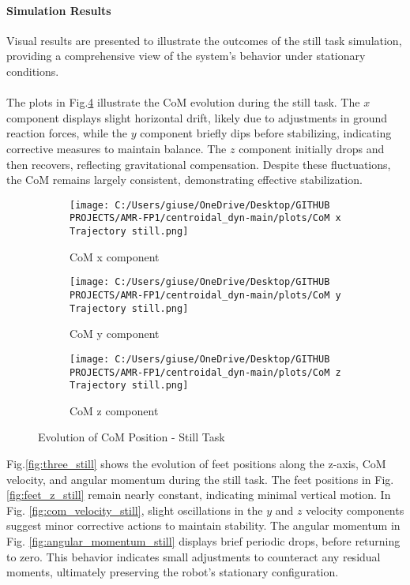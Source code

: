 \documentclass[main.tex]{subfiles}
\begin{document}
\begin{sloppypar}
\paragraph{Simulation Results}
Visual results are presented to illustrate the outcomes of the still task simulation, providing a comprehensive view of the system’s behavior under stationary conditions.\\
\\
The plots in Fig.\ref{fig:com_still} illustrate the CoM evolution during the still task. The \( x \) component displays slight horizontal drift, likely due to adjustments in ground reaction forces, while the \( y \) component briefly dips before stabilizing, indicating corrective measures to maintain balance. The \( z \) component initially drops and then recovers, reflecting gravitational compensation. Despite these fluctuations, the CoM remains largely consistent, demonstrating effective stabilization. \\
\begin{figure}[H]
    \centering
    \begin{subfigure}[b]{0.32\textwidth}
        \centering
        \texttt{[image: C:/Users/giuse/OneDrive/Desktop/GITHUB PROJECTS/AMR-FP1/centroidal\_dyn-main/plots/CoM x Trajectory still.png]}
        \caption{CoM x component}
        \label{fig:com_x_still}
    \end{subfigure}
    \hfill
    \begin{subfigure}[b]{0.32\textwidth}
        \centering
        \texttt{[image: C:/Users/giuse/OneDrive/Desktop/GITHUB PROJECTS/AMR-FP1/centroidal\_dyn-main/plots/CoM y Trajectory still.png]}
        \caption{CoM y component}
        \label{fig:com_y_still}
    \end{subfigure}
    \hfill
    \begin{subfigure}[b]{0.32\textwidth}
        \centering
        \texttt{[image: C:/Users/giuse/OneDrive/Desktop/GITHUB PROJECTS/AMR-FP1/centroidal\_dyn-main/plots/CoM z Trajectory still.png]}
        \caption{CoM z component}
        \label{fig:com_z_still}
    \end{subfigure}
    \caption{Evolution of CoM Position - Still Task}
    \label{fig:com_still}
\end{figure}
Fig.\ref{fig:three_still} shows the evolution of feet positions along the z-axis, CoM velocity, and angular momentum during the still task. The feet positions in Fig. \ref{fig:feet_z_still} remain nearly constant, indicating minimal vertical motion. In Fig. \ref{fig:com_velocity_still}, slight oscillations in the $y$ and $z$ velocity components suggest minor corrective actions to maintain stability. The angular momentum in Fig. \ref{fig:angular_momentum_still} displays brief periodic drops, before returning to zero. This behavior indicates small adjustments to counteract any residual moments, ultimately preserving the robot’s stationary configuration. \\

\end{sloppypar}
\end{document}
